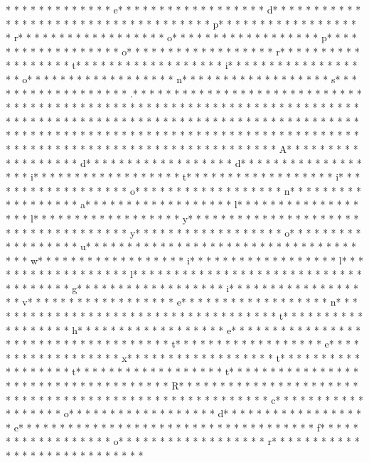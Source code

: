 *  * * *  *  * * *  *  * * *  * e* * *  * * *  * * *  *  * * *  *  * * *  * d* * *  * * *  * * *  *  * * *  *  * * *  *  * * *  * * *  * * *  *  * * *  *  * * *  * p* * *  * * *  * * *  *  * * *  *  * * *  * r* * *  * * *  * * *  *  * * *  *  * * *  * o* * *  * * *  * * *  *  * * *  *  * * *  * p* * *  * * *  * * *  *  * * *  *  * * *  * o* * *  * * *  * * *  *  * * *  *  * * *  * r* * *  * * *  * * *  *  * * *  *  * * *  * t* * *  * * *  * * *  *  * * *  *  * * *  * i* * *  * * *  * * *  *  * * *  *  * * *  * o* * *  * * *  * * *  *  * * *  *  * * *  * n* * *  * * *  * * *  *  * * *  *  * * *  * s* * *  * * *  * * *  *  * * *  *  * * *  * .* * *  * * *  * * *  *  * * *  *  * * *  * 
* * *  * * *  * * *  *  * * *  *  * * *  * * *  * * *  *  * * *  *  * * *  * * *  * * *  *  * * *  *  * * *  *  * * *  * * *  * * *  *  * * *  *  * * *  *  * * *  * * *  * * *  *  * * *  *  * * *  *  * * *  * * *  * * *  *  * * *  *  * * *  *  * * *  * * *  * * *  *  * * *  *  * * *  *  * * *  * * *  * * *  *  * * *  *  * * *  *  * * *  * * *  * * *  *  * * *  *  * * *  *  * * *  * * *  * * *  *  * * *  *  * * *  * A* * *  * * *  * * *  *  * * *  *  * * *  * d* * *  * * *  * * *  *  * * *  *  * * *  * d* * *  * * *  * * *  *  * * *  *  * * *  * i* * *  * * *  * * *  *  * * *  *  * * *  * t* * *  * * *  * * *  *  * * *  *  * * *  * i* * *  * * *  * * *  *  * * *  *  * * *  * o* * *  * * *  * * *  *  * * *  *  * * *  * n* * *  * * *  * * *  *  * * *  *  * * *  * a* * *  * * *  * * *  *  * * *  *  * * *  * l* * *  * * *  * * *  *  * * *  *  * * *  * l* * *  * * *  * * *  *  * * *  *  * * *  * y* * *  * * *  * * *  *  * * *  *  * * *  *  * * *  * * *  * * *  *  * * *  *  * * *  * y* * *  * * *  * * *  *  * * *  *  * * *  * o* * *  * * *  * * *  *  * * *  *  * * *  * u* * *  * * *  * * *  *  * * *  *  * * *  *  * * *  * * *  * * *  *  * * *  *  * * *  * w* * *  * * *  * * *  *  * * *  *  * * *  * i* * *  * * *  * * *  *  * * *  *  * * *  * l* * *  * * *  * * *  *  * * *  *  * * *  * l* * *  * * *  * * *  *  * * *  *  * * *  *  * * *  * * *  * * *  *  * * *  *  * * *  * g* * *  * * *  * * *  *  * * *  *  * * *  * i* * *  * * *  * * *  *  * * *  *  * * *  * v* * *  * * *  * * *  *  * * *  *  * * *  * e* * *  * * *  * * *  *  * * *  *  * * *  * n* * *  * * *  * * *  *  * * *  *  * * *  *  * * *  * * *  * * *  *  * * *  *  * * *  * t* * *  * * *  * * *  *  * * *  *  * * *  * h* * *  * * *  * * *  *  * * *  *  * * *  * e* * *  * * *  * * *  *  * * *  *  * * *  *  * * *  * * *  * * *  *  * * *  *  * * *  * t* * *  * * *  * * *  *  * * *  *  * * *  * e* * *  * * *  * * *  *  * * *  *  * * *  * x* * *  * * *  * * *  *  * * *  *  * * *  * t* * *  * * *  * * *  *  * * *  *  * * *  * t* * *  * * *  * * *  *  * * *  *  * * *  * t* * *  * * *  * * *  *  * * *  *  * * *  * {* * *  * * *  * * *  *  * * *  *  * * *  * R* * *  * * *  * * *  *  * * *  *  * * *  * }* * *  * * *  * * *  *  * * *  *  * * *  *  * * *  * * *  * * *  *  * * *  *  * * *  * c* * *  * * *  * * *  *  * * *  *  * * *  * o* * *  * * *  * * *  *  * * *  *  * * *  * d* * *  * * *  * * *  *  * * *  *  * * *  * e* * *  * * *  * * *  *  * * *  *  * * *  *  * * *  * * *  * * *  *  * * *  *  * * *  * f* * *  * * *  * * *  *  * * *  *  * * *  * o* * *  * * *  * * *  *  * * *  *  * * *  * r* * *  * * *  * * *  *  * * *  *  * * *  *  * * *  * * *  * * *  * 